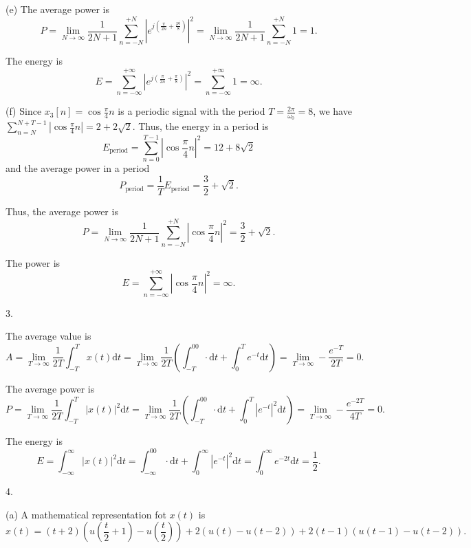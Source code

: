 \documentclass[a4paper]{article}
\begin{document}
(e) The average power is
$$P=\lim_{N\rightarrow\infty}\frac{1}{2N+1}\sum_{n=-N}^{+N}|e^{j(\frac{\pi}{2n}+\frac{pi}{8})}|^2=\lim_{N\rightarrow\infty}\frac{1}{2N+1}\sum_{n=-N}^{+N}1=1.$$

The energy is
$$E=\sum_{n=-\infty}^{+\infty}|e^{j(\frac{\pi}{2n}+\frac{\pi}{8})}|^2=\sum_{n=-\infty}^{+\infty}1=\infty.$$

(f) Since $x_3[n]=\cos{\frac{\pi}{4}n}$ is a periodic signal with the period $T=\frac{2\pi}{\omega_0}=8$, we have $\sum_{n=N}^{N+T-1}|\cos{\frac{\pi}{4}n}|=2+2\sqrt{2}$. Thus, the energy in a period is
$$E_\text{period}=\sum_{n=0}^{T-1}|\cos{\frac{\pi}{4}n}|^2=12+8\sqrt{2}$$
and the average power in a period
$$P_\text{period}=\frac{1}{T}E_\text{period}=\frac{3}{2}+\sqrt{2}.$$

Thus, the average power is
$$P=\lim_{N\rightarrow\infty}\frac{1}{2N+1}\sum_{n=-N}^{+N}|\cos{\frac{\pi}{4}n}|^2=\frac{3}{2}+\sqrt{2}.$$

The power is
$$E=\sum_{n=-\infty}^{+\infty}|\cos{\frac{\pi}{4}n}|^2=\infty.$$

3.

The average value is
$$A=\lim_{T\rightarrow\infty}\frac{1}{2T}\int_{-T}^Tx(t)\mathrm{d}t=\lim_{T\rightarrow\infty}\frac{1}{2T}(\int_{-T}^00\cdot\mathrm{d}t+\int_0^Te^{-t}\mathrm{d}t)=\lim_{T\rightarrow\infty}-\frac{e^{-T}}{2T}=0.$$

The average power is
$$P=\lim_{T\rightarrow\infty}\frac{1}{2T}\int_{-T}^T|x(t)|^2\mathrm{d}t=\lim_{T\rightarrow\infty}\frac{1}{2T}(\int_{-T}^00\cdot\mathrm{d}t+\int_0^T|e^{-t}|^2\mathrm{d}t)=\lim_{T\rightarrow\infty}-\frac{e^{-2T}}{4T}=0.$$

The energy is
$$E=\int_{-\infty}^\infty|x(t)|^2\mathrm{d}t=\int_{-\infty}^00\cdot\mathrm{d}t+\int_0^\infty|e^{-t}|^2\mathrm{d}t=\int_0^\infty e^{-2t}\mathrm{d}t=\frac{1}{2}.$$

4.

(a) A mathematical representation fot $x(t)$ is
$$x(t)=(t+2)(u(\frac{t}{2}+1)-u(\frac{t}{2}))+2(u(t)-u(t-2))+2(t-1)(u(t-1)-u(t-2)).$$
\end{document}
